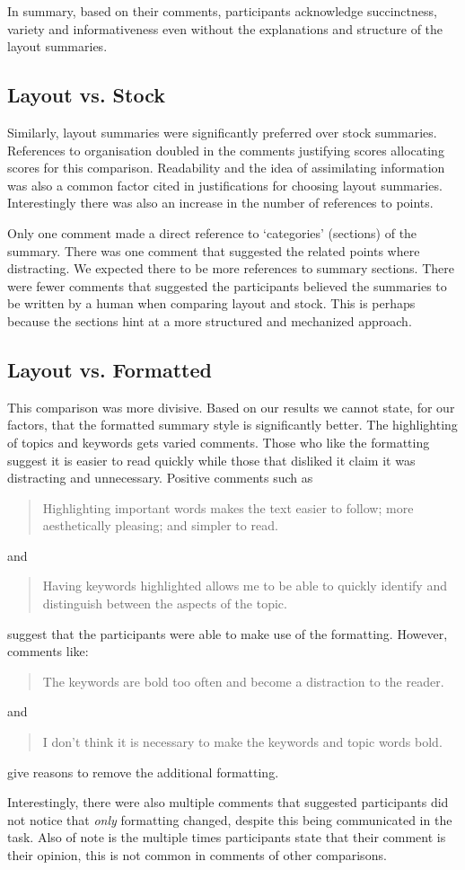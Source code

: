       In summary, based on their comments, participants acknowledge succinctness, variety and informativeness even without the explanations and structure of the layout summaries.

    \tocless\subsection{Layout vs. Stock}
      Similarly, layout summaries were significantly preferred over stock summaries. References to organisation doubled in the comments justifying scores allocating scores for this comparison. Readability and the idea of assimilating information was also a common factor cited in justifications for choosing layout summaries. Interestingly there was also an increase in the number of references to points.

      Only one comment made a direct reference to `categories' (sections) of the summary. There was one comment that suggested the related points where distracting. We expected there to be more references to summary sections. There were fewer comments that suggested the participants believed the summaries to be written by a human when comparing layout and stock. This is perhaps because the sections hint at a more structured and mechanized approach.

    \tocless\subsection{Layout vs. Formatted}
      This comparison was more divisive. Based on our results we cannot state, for our factors, that the formatted summary style is significantly better. The highlighting of topics and keywords gets varied comments. Those who like the formatting suggest it is easier to read quickly while those that disliked it claim it was distracting and unnecessary. Positive comments such as \blockquote{Highlighting important words makes the text easier to follow; more aesthetically pleasing; and simpler to read.} and \blockquote{Having keywords highlighted allows me to be able to quickly identify and distinguish between the aspects of the topic.} suggest that the participants were able to make use of the formatting. However, comments like: \blockquote{The keywords are bold too often and become a distraction to the reader.} and \blockquote{I don't think it is necessary to make the keywords and topic words bold.} give reasons to remove the additional formatting.

      Interestingly, there were also multiple comments that suggested participants did not notice that \textit{only} formatting changed, despite this being communicated in the task. Also of note is the multiple times participants state that their comment is their opinion, this is not common in comments of other comparisons.

